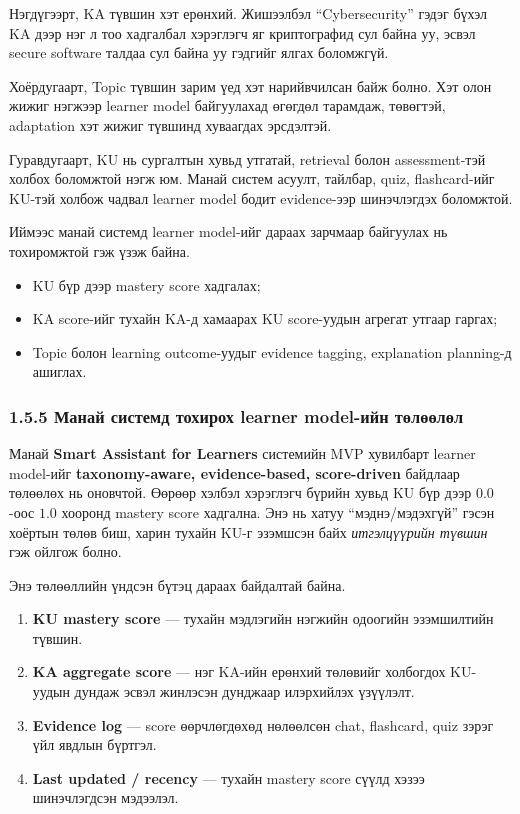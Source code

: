 \documentclass[12pt,A4]{report}
\begin{document}
Нэгдүгээрт, KA түвшин хэт ерөнхий. Жишээлбэл ``Cybersecurity'' гэдэг бүхэл KA дээр нэг л тоо хадгалбал хэрэглэгч яг криптографид сул байна уу, эсвэл secure software талдаа сул байна уу гэдгийг ялгах боломжгүй.

Хоёрдугаарт, Topic түвшин зарим үед хэт нарийвчилсан байж болно. Хэт олон жижиг нэгжээр learner model байгуулахад өгөгдөл тарамдаж,      төвөгтэй, adaptation хэт жижиг түвшинд хуваагдах эрсдэлтэй.

Гуравдугаарт, KU нь сургалтын хувьд утгатай, retrieval болон assessment-тэй холбох боломжтой нэгж юм. Манай систем асуулт, тайлбар, quiz, flashcard-ийг KU-тэй холбож чадвал learner model бодит evidence-ээр шинэчлэгдэх боломжтой.

Иймээс манай системд learner model-ийг дараах зарчмаар байгуулах нь тохиромжтой гэж үзэж байна.

\begin{itemize}
    \item KU бүр дээр mastery score хадгалах;
    \item KA score-ийг тухайн KA-д хамаарах KU score-уудын агрегат утгаар гаргах;
    \item Topic болон learning outcome-уудыг evidence tagging, explanation planning-д ашиглах.
\end{itemize}

\subsubsection{1.5.5 Манай системд тохирох learner model-ийн төлөөлөл}

Манай \textbf{Smart Assistant for Learners} системийн MVP хувилбарт learner model-ийг \textbf{taxonomy-aware, evidence-based, score-driven} байдлаар төлөөлөх нь оновчтой. Өөрөөр хэлбэл хэрэглэгч бүрийн хувьд KU бүр дээр $0.0$-оос $1.0$ хооронд mastery score хадгална. Энэ нь хатуу ``мэднэ/мэдэхгүй'' гэсэн хоёртын төлөв биш, харин тухайн KU-г эзэмшсэн байх \emph{итгэлцүүрийн түвшин} гэж ойлгож болно.

Энэ төлөөллийн үндсэн бүтэц дараах байдалтай байна.

\begin{enumerate}
    \item \textbf{KU mastery score} --- тухайн мэдлэгийн нэгжийн одоогийн эзэмшилтийн түвшин.
    \item \textbf{KA aggregate score} --- нэг KA-ийн ерөнхий төлөвийг холбогдох KU-уудын дундаж эсвэл жинлэсэн дунджаар илэрхийлэх үзүүлэлт.
    \item \textbf{Evidence log} --- score өөрчлөгдөхөд нөлөөлсөн chat, flashcard, quiz зэрэг үйл явдлын бүртгэл.
    \item \textbf{Last updated / recency} --- тухайн mastery score сүүлд хэзээ шинэчлэгдсэн мэдээлэл.
\end{enumerate}
\end{document}
